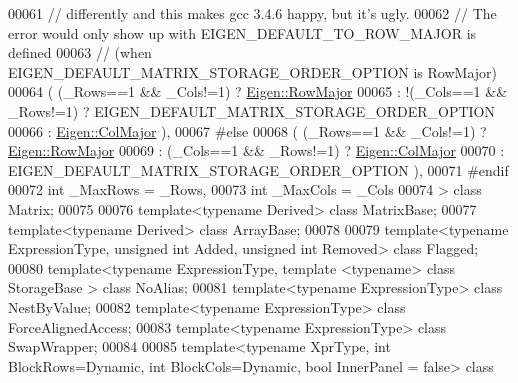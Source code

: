 \begin{DoxyCode}
00061     \textcolor{comment}{// differently and this makes gcc 3.4.6 happy, but it's ugly.}
00062     \textcolor{comment}{// The error would only show up with EIGEN\_DEFAULT\_TO\_ROW\_MAJOR is defined}
00063     \textcolor{comment}{// (when EIGEN\_DEFAULT\_MATRIX\_STORAGE\_ORDER\_OPTION is RowMajor)}
00064                           ( (\_Rows==1 && \_Cols!=1) ? \hyperlink{group__enums_ggaacded1a18ae58b0f554751f6cdf9eb13acfcde9cd8677c5f7caf6bd603666aae3}{Eigen::RowMajor}
00065                           : !(\_Cols==1 && \_Rows!=1) ?  EIGEN\_DEFAULT\_MATRIX\_STORAGE\_ORDER\_OPTION
00066                           : \hyperlink{group__enums_ggaacded1a18ae58b0f554751f6cdf9eb13a0cbd4bdd0abcfc0224c5fcb5e4f6669a}{Eigen::ColMajor} ),
00067 #\textcolor{keywordflow}{else}
00068                           ( (\_Rows==1 && \_Cols!=1) ? \hyperlink{group__enums_ggaacded1a18ae58b0f554751f6cdf9eb13acfcde9cd8677c5f7caf6bd603666aae3}{Eigen::RowMajor}
00069                           : (\_Cols==1 && \_Rows!=1) ? \hyperlink{group__enums_ggaacded1a18ae58b0f554751f6cdf9eb13a0cbd4bdd0abcfc0224c5fcb5e4f6669a}{Eigen::ColMajor}
00070                           : EIGEN\_DEFAULT\_MATRIX\_STORAGE\_ORDER\_OPTION ),
00071 \textcolor{preprocessor}{#endif}
00072          \textcolor{keywordtype}{int} \_MaxRows = \_Rows,
00073          \textcolor{keywordtype}{int} \_MaxCols = \_Cols
00074 > \textcolor{keyword}{class }Matrix;
00075 
00076 \textcolor{keyword}{template}<\textcolor{keyword}{typename} Derived> \textcolor{keyword}{class }MatrixBase;
00077 \textcolor{keyword}{template}<\textcolor{keyword}{typename} Derived> \textcolor{keyword}{class }ArrayBase;
00078 
00079 \textcolor{keyword}{template}<\textcolor{keyword}{typename} ExpressionType, \textcolor{keywordtype}{unsigned} \textcolor{keywordtype}{int} Added, \textcolor{keywordtype}{unsigned} \textcolor{keywordtype}{int} Removed> \textcolor{keyword}{class }Flagged;
00080 \textcolor{keyword}{template}<\textcolor{keyword}{typename} ExpressionType, \textcolor{keyword}{template} <\textcolor{keyword}{typename}> \textcolor{keyword}{class }StorageBase > \textcolor{keyword}{class }NoAlias;
00081 \textcolor{keyword}{template}<\textcolor{keyword}{typename} ExpressionType> \textcolor{keyword}{class }NestByValue;
00082 \textcolor{keyword}{template}<\textcolor{keyword}{typename} ExpressionType> \textcolor{keyword}{class }ForceAlignedAccess;
00083 \textcolor{keyword}{template}<\textcolor{keyword}{typename} ExpressionType> \textcolor{keyword}{class }SwapWrapper;
00084 
00085 \textcolor{keyword}{template}<\textcolor{keyword}{typename} XprType, \textcolor{keywordtype}{int} BlockRows=Dynamic, \textcolor{keywordtype}{int} BlockCols=Dynamic, \textcolor{keywordtype}{bool} InnerPanel = false> \textcolor{keyword}{class }

\end{DoxyCode}
